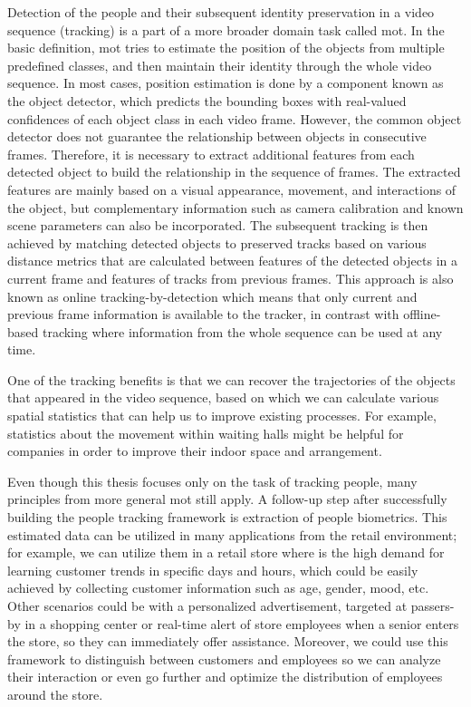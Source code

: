 \begin{introduction}
    Detection of the people and their subsequent identity preservation in a video sequence (tracking) is a part of a more broader domain task called \gls{mot}. In the basic definition, \gls{mot} tries to estimate the position of the objects from multiple predefined classes, and then maintain their identity through the whole video sequence. In most cases, position estimation is done by a component known as the object detector, which predicts the bounding boxes with real-valued confidences of each object class in each video frame. However, the common object detector does not guarantee the relationship between objects in consecutive frames. Therefore, it is necessary to extract additional features from each detected object to build the relationship in the sequence of frames. The extracted features are mainly based on a visual appearance, movement, and interactions of the object, but complementary information such as camera calibration and known scene parameters can also be incorporated. The subsequent tracking is then achieved by matching detected objects to preserved tracks based on various distance metrics that are calculated between features of the detected objects in a current frame and features of tracks from previous frames. This approach is also known as online tracking-by-detection which means that only current and previous frame information is available to the tracker, in contrast with offline-based tracking where information from the whole sequence can be used at any time. 
    
    One of the tracking benefits is that we can recover the trajectories of the objects that appeared in the video sequence, based on which we can calculate various spatial statistics that can help us to improve existing processes. For example, statistics about the movement within waiting halls might be helpful for companies in order to improve their indoor space and arrangement. 
    
    Even though this thesis focuses only on the task of tracking people, many principles from more general \gls{mot} still apply. A follow-up step after successfully building the people tracking framework is extraction of people biometrics. This estimated data can be utilized in many applications from the retail environment; for example, we can utilize them in a retail store where is the high demand for learning customer trends in specific days and hours, which could be easily achieved by collecting customer information such as age, gender, mood, etc. Other scenarios could be with a personalized advertisement, targeted at passers-by in a shopping center or real-time alert of store employees when a senior enters the store, so they can immediately offer assistance. Moreover, we could use this framework to distinguish between customers and employees so we can analyze their interaction or even go further and optimize the distribution of employees around the store.
    

\end{introduction}
